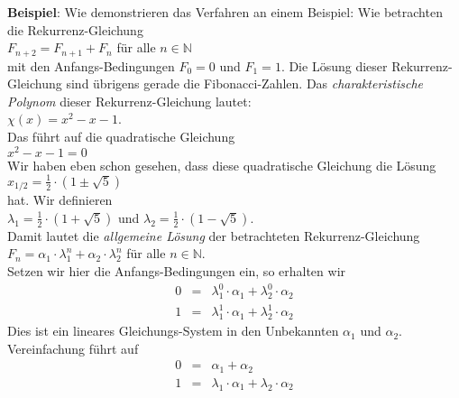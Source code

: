 \noindent
\textbf{Beispiel}:  Wie demonstrieren das Verfahren an einem Beispiel: Wie betrachten die
Rekurrenz-Gleichung \\[0.1cm]
\hspace*{1.3cm} $F_{n+2} = F_{n+1} + F_{n}$ \quad f\"ur alle $n \in \mathbb{N}$  \\[0.1cm]
mit den Anfangs-Bedingungen $F_0 = 0$ und $F_1 = 1$.  Die L\"osung dieser
Rekurrenz-Gleichung sind \"ubrigens gerade die Fibonacci-Zahlen.
Das \emph{charakteristische Polynom} dieser Rekurrenz-Gleichung lautet: \\[0.1cm]
\hspace*{1.3cm} $\chi(x) = x^2 - x - 1$.  \\[0.1cm]
Das f\"uhrt auf die quadratische Gleichung \\[0.1cm]
\hspace*{1.3cm} $x^2 -x - 1 = 0$ \\[0.1cm]
Wir haben eben schon gesehen, dass diese quadratische Gleichung die L\"osung \\[0.1cm]
\hspace*{1.3cm}
 $ x_{1/2} = \frac{1}{2} \cdot (1 \pm \sqrt{5})$ 
\\[0.1cm]
hat.  Wir definieren \\[0.1cm]
\hspace*{1.3cm} 
$\lambda_1 = \frac{1}{2} \cdot (1 + \sqrt{5})$ \quad und  \quad 
$\lambda_2 = \frac{1}{2} \cdot (1 - \sqrt{5})$. \\[0.1cm]
Damit lautet die \emph{allgemeine L\"osung} der betrachteten Rekurrenz-Gleichung \\[0.1cm]
\hspace*{1.3cm}  $F_n = \alpha_1 \cdot \lambda_1^n  + \alpha_2 \cdot \lambda_2^n$ \quad f\"ur alle $n \in \mathbb{N}$. \\[0.1cm]
Setzen wir hier die Anfangs-Bedingungen ein, so erhalten wir
\[
\begin{array}{lcl}
    0 & = & \lambda_1^0 \cdot \alpha_1 + \lambda_2^0   \cdot \alpha_2 \\[0.1cm]
    1 & = & \lambda_1^1 \cdot \alpha_1 + \lambda_2^{1} \cdot \alpha_2 
\end{array}
\]
Dies ist ein lineares Gleichungs-System in den Unbekannten $\alpha_1$ und
$\alpha_2$. Vereinfachung f\"uhrt auf 
\[
\begin{array}{lcl}
    0 & = & \alpha_1 + \alpha_2 \\[0.1cm]
    1 & = & \lambda_1 \cdot \alpha_1 + \lambda_2 \cdot \alpha_2 
\end{array}
\]
